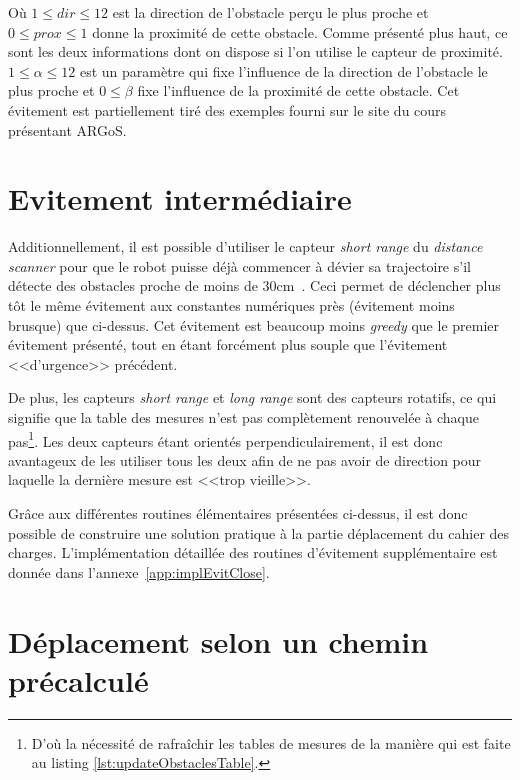 Où $ 1 \leq dir \leq 12 $ est la direction de l'obstacle perçu le plus proche et \hbox{$0 \leq prox \leq 1$} donne la proximité de cette obstacle. Comme présenté plus haut, ce sont les deux informations dont on dispose si l'on utilise le capteur de proximité.  \(1 \leq \alpha \leq 12 \) est un paramètre qui fixe l'influence de la direction de l'obstacle le plus proche et \(0 \leq \beta \) fixe l'influence de la proximité de cette obstacle. Cet évitement est partiellement tiré des exemples fourni sur le site du cours présentant ARGoS.~\cite{argosSite1}

\section{Evitement intermédiaire}

Additionnellement, il est possible d'utiliser le capteur \emph{short range} du \emph{distance scanner} pour que le robot puisse déjà commencer à dévier sa trajectoire s'il détecte des obstacles proche de moins de 30cm~\cite{argosSite1}. Ceci permet de déclencher plus tôt le même évitement aux constantes numériques près (évitement moins brusque) que ci-dessus. Cet évitement est beaucoup moins \emph{greedy} que le premier évitement présenté, tout en étant forcément plus souple que l'évitement <<d'urgence>> précédent.

De plus, les capteurs \emph{short range} et \emph{long range} sont des capteurs rotatifs, ce qui signifie que la table des mesures n'est pas complètement renouvelée à chaque pas\footnote{D'où la nécessité de rafraîchir les tables de mesures de la manière qui est faite au listing \ref{lst:updateObstaclesTable}.}. Les deux capteurs étant orientés perpendiculairement, il est donc avantageux de les utiliser tous les deux afin de ne pas avoir de direction pour laquelle la dernière mesure est <<trop vieille>>.

\vspace{2em}
Grâce aux différentes routines élémentaires présentées ci-dessus, il est donc possible de construire une solution pratique à la partie déplacement du cahier des charges. L'implémentation détaillée des routines d'évitement supplémentaire est donnée dans l'annexe~\ref{app:implEvitClose}.

\section{Déplacement selon un chemin précalculé}

